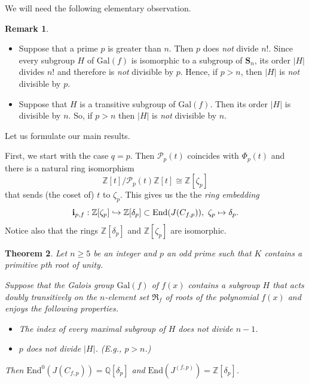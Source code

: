 \documentclass[12pt,a4paper,reqno]{amsart}
\def\Q{{\mathbb Q}}
\def\Z{{\mathbb Z}}
\def\R{{\mathbb R}}
\def\R{{\mathfrak R}}
\def\Gal{\mathrm{Gal}}
\def\End{\mathrm{End}}
\newtheorem{thm}{Theorem}[section]
\theoremstyle{definition}
\newtheorem{rem}[thm]{Remark}
\begin{document}
We will need the following elementary observation.

\begin{rem}
\label{pNdiv}
\begin{itemize}
\item[(i)]
Suppose that a prime $p$ is greater than $n$. Then $p$ does {\sl not} divide $n!$. Since every subgroup $H$ of $\Gal(f)$ is isomorphic to a subgroup of $\mathbf{S}_n$,   its order $|H|$ divides $n!$ and therefore is {\sl not} divisible by $p$. Hence, if $p>n$, then  $|H|$  is {\sl not} divisible by $p$.
\item[(ii)]
Suppose that $H$ is a transitive subgroup of $\Gal(f)$.  Then its order $|H|$ is divisible by $n$.
So, if $p>n$  then $|H|$ is {\sl not} divisible by $n$.
\end{itemize}
\end{rem}

Let us formulate our main results.

First, we start with the case $q=p$. Then $\mathcal{P}_p(t)$ coincides with  $\Phi_p(t)$ and there is a natural ring isomorphism
$$\Z[t]/\mathcal{P}_p(t)\Z[t] \cong \Z[\zeta_p]$$
that sends (the coset of) $t$ to $\zeta_p$.
This gives us the the {\sl ring embedding}
\begin{equation}
\label{embedP}
{\bf i}_{p,f}: \Z[\zeta_p] \hookrightarrow \Z[\delta_p] \subset \End(J(C_{f,p})), \ \zeta_p  \mapsto \delta_p.
\end{equation}
Notice also that the rings $\Z[\delta_p]$ and $\Z[\zeta_p]$ are isomorphic.
\begin{thm}
\label{primeToP}
Let $n \ge 5$ be an integer and $p$ an odd prime such that   $K$ contains a primitive $p$th root of unity.

Suppose that the Galois group $\Gal(f)$ of $f(x)$ contains a subgroup $H$  that acts doubly transitively
on the  $n$-element set $\R_f$ of roots of the polynomial $f(x)$ and enjoys the following properties.
\begin{itemize}
\item[(i)]
 The index of every maximal subgroup of  $H$  does not divide $n-1$.
\item[(ii)]
 $p$   does not divide  $|H|$. (E.g., $p>n$.)
\end{itemize}
Then $\End^0(J(C_{f,p}))=\Q[\delta_p]$ and $\End(J^{(f,p)})=\Z[\delta_p]$.
\end{thm}
\end{document}
